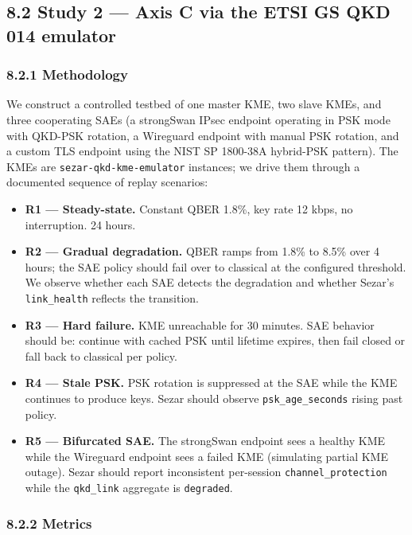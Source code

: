 \subsection{8.2 Study 2 --- Axis C via the ETSI GS QKD 014
emulator}\label{study-2-axis-c-via-the-etsi-gs-qkd-014-emulator}

\subsubsection{8.2.1 Methodology}\label{methodology-1}

We construct a controlled testbed of one master KME, two slave KMEs, and
three cooperating SAEs (a strongSwan IPsec endpoint operating in PSK
mode with QKD-PSK rotation, a Wireguard endpoint with manual PSK
rotation, and a custom TLS endpoint using the NIST SP 1800-38A
hybrid-PSK pattern). The KMEs are \texttt{sezar-qkd-kme-emulator}
instances; we drive them through a documented sequence of replay
scenarios:

\begin{itemize}
\tightlist
\item
  \textbf{R1 --- Steady-state.} Constant QBER 1.8\%, key rate 12 kbps,
  no interruption. 24 hours.
\item
  \textbf{R2 --- Gradual degradation.} QBER ramps from 1.8\% to 8.5\%
  over 4 hours; the SAE policy should fail over to classical at the
  configured threshold. We observe whether each SAE detects the
  degradation and whether Sezar's \texttt{link\_health} reflects the
  transition.
\item
  \textbf{R3 --- Hard failure.} KME unreachable for 30 minutes. SAE
  behavior should be: continue with cached PSK until lifetime expires,
  then fail closed or fall back to classical per policy.
\item
  \textbf{R4 --- Stale PSK.} PSK rotation is suppressed at the SAE while
  the KME continues to produce keys. Sezar should observe
  \texttt{psk\_age\_seconds} rising past policy.
\item
  \textbf{R5 --- Bifurcated SAE.} The strongSwan endpoint sees a healthy
  KME while the Wireguard endpoint sees a failed KME (simulating partial
  KME outage). Sezar should report inconsistent per-session
  \texttt{channel\_protection} while the \texttt{qkd\_link} aggregate is
  \texttt{degraded}.
\end{itemize}

\subsubsection{8.2.2 Metrics}\label{metrics-1}


